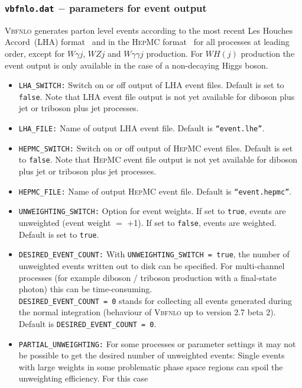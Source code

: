 \documentclass[english,12pt]{article}
\begin{document}
\subsubsection{{\tt vbfnlo.dat} $-$ parameters for event output}
\label{sec:lha}
\textsc{Vbfnlo} generates parton level events according to the most
recent Les Houches Accord~(LHA) format~\cite{Alwall:2006yp} and in the
\textsc{HepMC} format~\cite{Dobbs:2001ck} for all processes at leading order,
except for $W\gamma j$, $WZj$ and $W\gamma\gamma j$ production.
For $WH(j)$ production the event output is only available in the case of
a non-decaying Higgs boson.
\begin{itemize}
\item {\tt LHA\_SWITCH:} Switch on or off output of LHA event files. Default is
set to {\tt false}.   Note that LHA event file output is not yet available for
diboson plus jet or triboson plus jet processes.
\item {\tt LHA\_FILE:} Name of output LHA event file.  Default is {\tt ``event.lhe''}.
\item {\tt HEPMC\_SWITCH:} Switch on or off output of \textsc{HepMC} event files. Default is
set to {\tt false}.   Note that \textsc{HepMC} event file output is not yet available for
diboson plus jet or triboson plus jet processes.
\item {\tt HEPMC\_FILE:} Name of output \textsc{HepMC} event file.  Default is
{\tt ``event.hepmc''}.
\item {\tt UNWEIGHTING\_SWITCH:} Option for event weights. If set to {\tt true}, 
  events are unweighted
  (event weight $=$ +1). If set to {\tt false}, events are weighted.  Default is set 
  to {\tt true}.
\item {\tt DESIRED\_EVENT\_COUNT:} With {\tt UNWEIGHTING\_SWITCH = true}, the number of
  unweighted events written out to disk can be specified. For multi-channel processes 
  (for example diboson / triboson production with a final-state photon) this can be
  time-consuming.\\
  {\tt DESIRED\_EVENT\_COUNT = 0} stands for collecting all events generated during the
  normal integration (behaviour of \textsc{Vbfnlo} up to version 2.7 beta 2).\\
  Default is {\tt DESIRED\_EVENT\_COUNT = 0}.
\item {\tt PARTIAL\_UNWEIGHTING:} For some processes or parameter settings it may not be possible
  to get the desired number of unweighted events: Single events with large weights in some
  problematic phase space regions can spoil the unweighting efficiency. For this case

\end{itemize}
\end{document}
